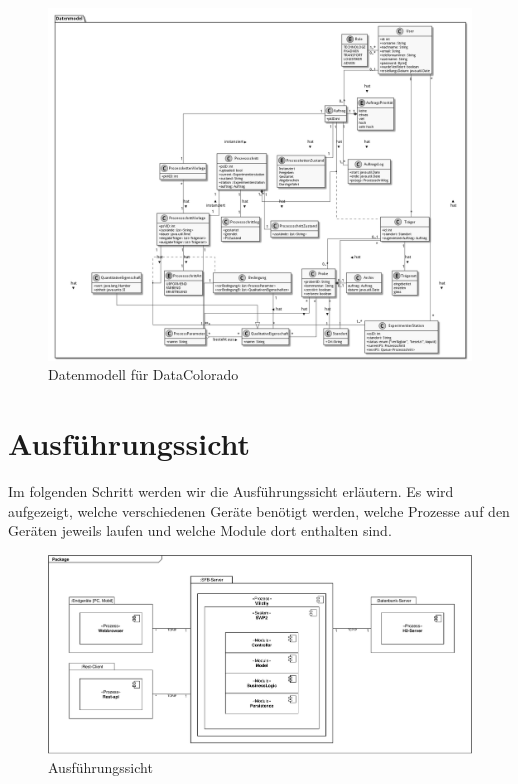 \documentclass[enabledeprecatedfontcommands,fontsize=12pt,paper=a4,twoside]{scrartcl}
\begin{document}
 \begin{figure}[H]
  \caption{Datenmodell für DataColorado}
  \centering
  \includegraphics[width=1.1\textwidth]{UML/datenModel}

 \end{figure}
\newpage
\section{Ausführungssicht}

\label{sec:ausfuehrung}


{ Im folgenden Schritt werden wir die Ausführungssicht erläutern. Es wird aufgezeigt, welche verschiedenen Geräte benötigt werden, welche Prozesse auf den Geräten jeweils laufen und welche Module dort enthalten sind.
}


\begin{figure}[H]
\includegraphics[scale=0.5]{UML/06Ausfuehrungssicht.pdf}
 \caption{Ausführungssicht}
\end{figure}
\end{document}

